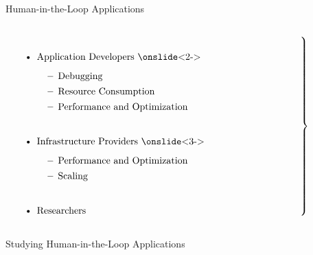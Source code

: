 \documentclass[aspectratio=1610]{beamer}
\begin{document}
\begin{frame}{Human-in-the-Loop Applications}
    \begin{columns}[onlytextwidth]
        \begin{column}{.5\linewidth}
            $\left.
            \begin{tabular}{p{.85\linewidth}}
                \begin{itemize}
                    \itemsep2em
                    \item Application Developers
                    \onslide<2->{\begin{itemize}
                        \item Debugging
                        \item Resource Consumption
                        \item Performance and Optimization
                    \end{itemize}}
                    \item Infrastructure Providers
                    \onslide<3->{\begin{itemize}
                        \item Performance and Optimization
                        \item Scaling
                    \end{itemize}}
                    \item Researchers
                \end{itemize}
            \end{tabular}
            \right\}$
        \end{column}
        \begin{column}{.5\linewidth}
            \centering\Large\bfseries%
        \end{column}
    \end{columns}
\end{frame}

\begin{frame}{Studying Human-in-the-Loop Applications}
    \begin{center}
        \\
        \vspace{2em}%
    \end{center}
\end{frame}
\end{document}
